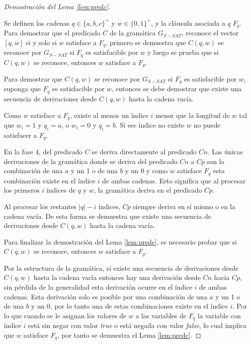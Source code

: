 \documentclass{article}
\newcommand{\true}{\textit{true}}
\newcommand{\false}{\textit{false}}
\begin{document}
\begin{proof}[Demostración del Lema \ref{lem:predc}] \

    Se definen las cadenas $q\in \{a,b,c\}^+$ y $w\in \{0,1\}^+$, y la cláusula asociada a $q$ $F_q$.  Para demostrar que el predicado $C$ de la gramática $G_{S-SAT}$, reconoce el vector $[q,w]$ si y solo si $w$ satisface a $F_q$, primero se demuestra que $C(q,w)$ se reconoce por $G_{S-SAT}$ si $F_q$ es satisfacible por $w$ y luego se prueba que si $C(q,w)$ se reconoce, entonces $w$ satisface a $F_q$.

    Para demostrar que $C(q,w)$ se reconoce por $G_{S-SAT}$ si $F_q$ es satisfacible por $w$, suponga que $F_q$ es satisfacible por $w$, entonces se debe demostrar que existe una secuencia de derivaciones desde $C(q,w)$ hasta la cadena vacía.

    Como $w$ satisface a $F_q$, existe al menos un índice $i$ menor que la longitud de $w$ tal que $w_i=1$ y $q_i = a$, o $w_i=0$ y $q_i=b$. Si ese índice no existe $w$ no puede satisfacer a $F_q$.

    En la fase 4, del predicado $C$ se deriva directamente al predicado $Cn$. Las únicas derivaciones de la gramática donde se deriva del predicado $Cn$ a $Cp$ son la combinación de una $a$ y un 1 o de una $b$ y un 0 y como $w$ satisface $F_q$ esta combinación existe en el índice $i$ de ambas cadenas. Esto significa que al procesar los primeros $i$ índices de $q$ y $w$, la gramática deriva en el predicado $Cp$.

    Al procesar los restantes $|q|-i$ índices, $Cp$ siempre deriva en sí mismo o en la cadena vacía. De esta forma se demuestra que existe una secuencia de derivaciones desde $C(q,w)$ hasta la cadena vacía.

    Para finalizar la demostración del Lema \ref{lem:predc}, es necesario probar que si $C(q,w)$ se reconoce, entonces $w$ satisface a $F_q$.

    Por la estructura de la gramática, si existe una secuencia de derivaciones desde $C(q,w)$ hasta la cadena vacía entonces hay una derivación desde $Cn$ hacia $Cp$, sin pérdida de la generalidad esta derivación ocurre en el índice $i$ de ambas cadenas. Esta derivación solo es posible por una combinación de una $a$ y un 1 o de una $b$ y un 0, por lo tanto una de estas combinaciones existe en el índice $i$. Por lo que cuando se le asignan los valores de $w$ a las variables de $F_q$ la variable con índice $i$ está
    sin negar con valor \true{} o está negada con valor \false{}, lo cual implica que $w$ satisface $F_q$, por tanto se demuestra el Lema \ref{lem:predc}.
\end{proof}
\end{document}
